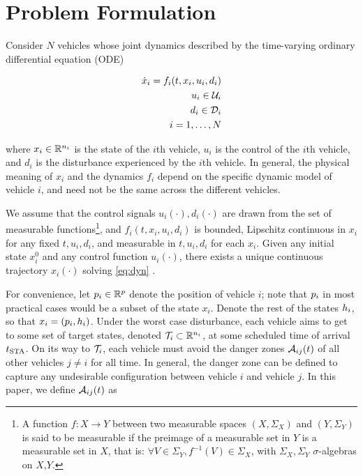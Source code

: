\section{Problem Formulation \label{sec:formulation}}
Consider $N$ vehicles whose joint dynamics described by the time-varying ordinary differential equation (ODE)

\begin{equation}
\label{eq:dyn}
\begin{aligned}
\dot{x}_i = f_i(t, x_i, u_i, d_i) \\
u_i \in \mathcal{U}_i \\
d_i \in \mathcal{D}_i \\
i = 1,\ldots, N
\end{aligned}
\end{equation}

\noindent where $x_i \in \mathbb{R}^{n_i}$ is the state of the $i$th vehicle, $u_i$ is the control of the $i$th vehicle, and $d_i$ is the disturbance experienced by the $i$th vehicle. In general, the physical meaning of $x_i$ and the dynamics $f_i$ depend on the specific dynamic model of vehicle $i$, and need not be the same across the different vehicles. 

We assume that the control signals $u_i(\cdot), d_i(\cdot)$ are drawn from the set of measurable functions\footnote{
A function $f:X\to Y$ between two measurable spaces $(X,\Sigma_X)$ and $(Y,\Sigma_Y)$ is said to be measurable if the preimage of a measurable set in $Y$ is a measurable set in $X$, that is: $\forall V\in\Sigma_Y, f^{-1}(V)\in\Sigma_X$, with $\Sigma_X,\Sigma_Y$ $\sigma$-algebras on $X$,$Y$.}, and $f_i(t,x_i, u_i, d_i)$ is bounded, Lipschitz continuous in $x_i$ for any fixed $t, u_i, d_i$, and measurable in $t, u_i, d_i$ for each $x_i$. Given any initial state $x_i^0$ and any control function $u_i(\cdot)$, there exists a unique continuous trajectory $x_i(\cdot)$ solving \eqref{eq:dyn} \cite{Coddington55}.

For convenience, let $p_i \in \mathbb{R}^p$ denote the position of vehicle $i$; note that $p_i$ in most practical cases would be a subset of the state $x_i$. Denote the rest of the states $h_i$, so that $x_i = (p_i, h_i)$. Under the worst case disturbance, each vehicle aims to get to some set of target states, denoted $\mathcal{T}_i \subset \mathbb{R}^{n_i}$, at some scheduled time of arrival $t_\text{STA}$. On its way to $\mathcal{T}_i$, each vehicle must avoid the danger zones $\mathcal{A}_{ij}(t)$ of all other vehicles $j\neq i$ for all time. In general, the danger zone can be defined to capture any undesirable configuration between vehicle $i$ and vehicle $j$. In this paper, we define $\mathcal{A}_{ij}(t)$ as

